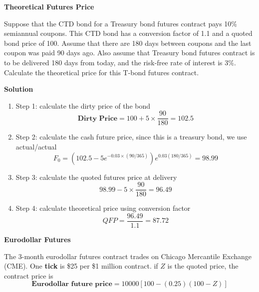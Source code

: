 \documentclass[11pt,fleqn]{book} %
\numberwithin{equation}{section} %
\numberwithin{figure}{section} %
\numberwithin{table}{section} %
\begin{document}
  \begin{exercise}\textbf{Theoretical Futures Price}
 
Suppose that the CTD bond for a Treasury bond futures contract pays 10\% semiannual
coupons. This CTD bond has a conversion factor of 1.1 and a quoted bond price of
100. Assume that there are 180 days between coupons and the last coupon was paid 90
days ago. Also assume that Treasury bond futures contract is to be delivered 180 days
from today, and the risk-free rate of interest is 3\%. Calculate the theoretical price for this
T-bond futures contract.
 
 
 \textbf{Solution}
 \begin{enumerate}
     \item Step 1: calculate the dirty price of the bond
     $$
     \textbf{Dirty Price}=100+5\times\frac{90}{180}=102.5
     $$
     \item Step 2: calculate the cash future price, since this is a treasury bond, we use actual/actual
     $$
     F_0=(102.5-5e^{-0.03\times(90/365)})e^{0.03(180/365)}=98.99
     $$
     \item Step 3: calculate the quoted futures price at delivery
     $$
     98.99-5\times\frac{90}{180}=96.49
     $$
     \item Step 4: calculate theoretical price using conversion factor
     $$
     QFP=\frac{96.49}{1.1}=87.72
     $$
 \end{enumerate}
 \end{exercise}
 \begin{definition}\textbf{Eurodollar Futures}
 
 The 3-month eurodollar futures contract trades on Chicago Mercantile Exchange (CME). One \textbf{tick} is \$25 per \$1 million contract. if $Z$ is the quoted price, the contract price is
 $$
 \textbf{Eurodollar future price}=10000[100-(0.25)(100-Z)]
 $$
 \end{definition}
\end{document}
